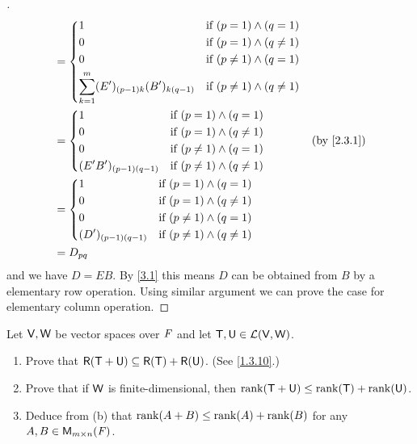 \begin{proof}[]
\begin{align*}
     & = \begin{dcases}
           1                                                & \text{if } (p = 1) \land (q = 1)       \\
           0                                                & \text{if } (p = 1) \land (q \neq 1)    \\
           0                                                & \text{if } (p \neq 1) \land (q = 1)    \\
           \sum_{k = 1}^m (E')_{(p - 1) k} (B')_{k (q - 1)} & \text{if } (p \neq 1) \land (q \neq 1)
         \end{dcases}                        \\
     & = \begin{dcases}
           1                         & \text{if } (p = 1) \land (q = 1)       \\
           0                         & \text{if } (p = 1) \land (q \neq 1)    \\
           0                         & \text{if } (p \neq 1) \land (q = 1)    \\
           (E' B')_{(p - 1) (q - 1)} & \text{if } (p \neq 1) \land (q \neq 1)
         \end{dcases}                              &  & \by{2.3.1}                                               \\
     & = \begin{dcases}
           1                      & \text{if } (p = 1) \land (q = 1)       \\
           0                      & \text{if } (p = 1) \land (q \neq 1)    \\
           0                      & \text{if } (p \neq 1) \land (q = 1)    \\
           (D')_{(p - 1) (q - 1)} & \text{if } (p \neq 1) \land (q \neq 1)
         \end{dcases}                                                  \\
     & = D_{p q}
  \end{align*}
  and we have \(D = EB\).
  By \cref{3.1} this means \(D\) can be obtained from \(B\) by a elementary row operation.
  Using similar argument we can prove the case for elementary column operation.
\end{proof}

\setcounter{ex}{13}
\begin{ex}\label{ex:3.2.14}
  Let \(\mathsf{V}, \mathsf{W}\) be vector spaces over \(\mathit{F}\) and let \(\mathsf{T}, \mathsf{U} \in \mathcal{L}(\mathsf{V}, \mathsf{W})\).
  \begin{enumerate}
    \item Prove that \(\rg{\T + \U} \subseteq \rg{\T} + \rg{\U}\).
          (See \cref{1.3.10}.)
    \item Prove that if \(\mathsf{W}\) is finite-dimensional, then \(\rk{\T + \U} \leq \rk{\T} + \rk{\U}\).
    \item Deduce from (b) that \(\rk{A + B} \leq \rk{A} + \rk{B}\) for any \(A, B \in \ms\).
  \end{enumerate}
\end{ex}

